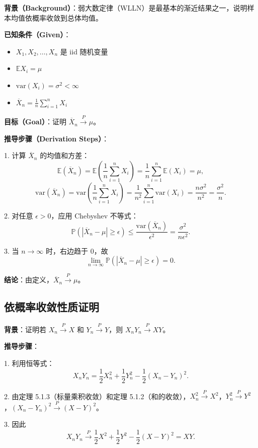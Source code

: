 \textbf{背景（Background）}：弱大数定律（WLLN）是最基本的渐近结果之一，说明样本均值依概率收敛到总体均值。

\textbf{已知条件（Given）}：
\begin{itemize}
\item $X_1, X_2, \ldots, X_n$ 是 iid 随机变量
\item $\mathbb{E}X_i = \mu$
\item $\text{var}(X_i) = \sigma^2 < \infty$
\item $\overline{X}_n = \frac{1}{n}\sum_{i=1}^n X_i$
\end{itemize}

\textbf{目标（Goal）}：证明 $\overline{X}_n \xrightarrow{P} \mu$。

\textbf{推导步骤（Derivation Steps）}：

1. 计算 $\overline{X}_n$ 的均值和方差：
\[
\mathbb{E}(\overline{X}_n) = \mathbb{E}\left(\frac{1}{n}\sum_{i=1}^n X_i\right) = \frac{1}{n}\sum_{i=1}^n \mathbb{E}(X_i) = \mu,
\]
\[
\text{var}(\overline{X}_n) = \text{var}\left(\frac{1}{n}\sum_{i=1}^n X_i\right) = \frac{1}{n^2}\sum_{i=1}^n \text{var}(X_i) = \frac{n\sigma^2}{n^2} = \frac{\sigma^2}{n}.
\]

2. 对任意 $\epsilon > 0$，应用 Chebyshev 不等式：
\[
\mathbb{P}(|\overline{X}_n - \mu| \geq \epsilon) \leq \frac{\text{var}(\overline{X}_n)}{\epsilon^2} = \frac{\sigma^2}{n\epsilon^2}.
\]

3. 当 $n \to \infty$ 时，右边趋于 $0$，故
\[
\lim_{n \to \infty} \mathbb{P}(|\overline{X}_n - \mu| \geq \epsilon) = 0.
\]

\textbf{结论}：由定义，$\overline{X}_n \xrightarrow{P} \mu$。

\subsection{依概率收敛性质证明}\label{sec:convergence-product-proof}

\textbf{背景}：证明若 $X_n \xrightarrow{P} X$ 和 $Y_n \xrightarrow{P} Y$，则 $X_n Y_n \xrightarrow{P} XY$。

\textbf{推导步骤}：

1. 利用恒等式：
\[
X_n Y_n = \frac{1}{2}X_n^2 + \frac{1}{2}Y_n^2 - \frac{1}{2}(X_n - Y_n)^2.
\]

2. 由定理 5.1.3（标量乘积收敛）和定理 5.1.2（和的收敛），$X_n^2 \xrightarrow{P} X^2$，$Y_n^2 \xrightarrow{P} Y^2$，$(X_n - Y_n)^2 \xrightarrow{P} (X - Y)^2$。

3. 因此
\[
X_n Y_n \xrightarrow{P} \frac{1}{2}X^2 + \frac{1}{2}Y^2 - \frac{1}{2}(X - Y)^2 = XY.
\]

